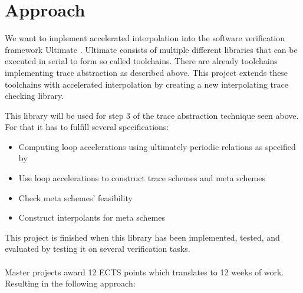 \documentclass{article}
\begin{document}
\section{Approach}
We want to implement accelerated interpolation into the software verification framework Ultimate \cite{Zitat02}. Ultimate consists of multiple different libraries that can be executed in serial to form so called toolchains. There are already toolchains implementing trace abstraction as described above. This project extends these toolchains with accelerated interpolation by creating a new interpolating trace checking library. \par 
This library will be used for step 3 of the trace abstraction technique seen above. For that it has to fulfill several specifications: 
\begin{itemize}
	\item Computing loop accelerations using ultimately periodic relations as specified by 
	\item Use loop accelerations to construct trace schemes and meta schemes
	\item Check meta schemes' feasibility
	\item Construct interpolants for meta schemes
\end{itemize}
This project is finished when this library has been implemented, tested, and evaluated by testing it on several verification tasks. \\ \\
Master projects award 12 ECTS points which translates to 12 weeks of work. Resulting in the following approach:
\end{document}
